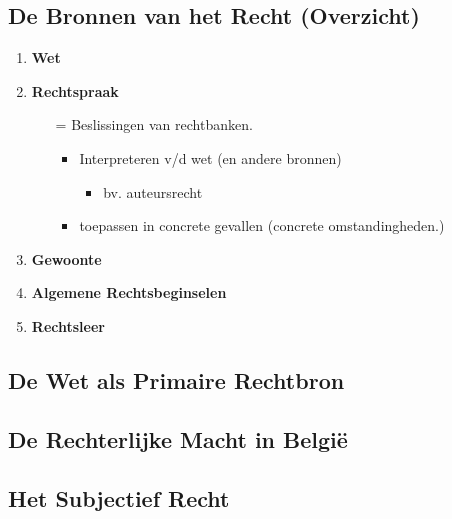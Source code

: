 \subsection*{De Bronnen van het Recht (Overzicht)}
\begin{enumerate}
	\item \textbf{Wet}
	
	\item \textbf{Rechtspraak}
	\begin{itemize}
		\item[=] Beslissingen van rechtbanken.
		\begin{itemize}
			\item Interpreteren v/d wet (en andere bronnen)
			\begin{itemize}
				\item bv. auteursrecht
			\end{itemize}
		\item toepassen in concrete gevallen (concrete omstandingheden.)
		\end{itemize}
	\end{itemize}
	\item \textbf{Gewoonte}
	
	\item \textbf{Algemene Rechtsbeginselen}
	\item \textbf{Rechtsleer}
\end{enumerate}
\subsection*{De Wet als Primaire Rechtbron}

\subsection*{De Rechterlijke Macht in Belgi\"e}

\subsection*{Het Subjectief Recht}
